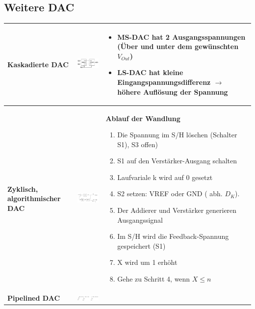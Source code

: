 \subsection{Weitere DAC}
\begin{longtable}{|>{\bfseries}p{4cm}|c|p{8cm}|}
	\hline
	Kaskadierte DAC
	& \includegraphics[width=6cm, valign=t]{./pictures/kaskadiertDAC.png}
	& \begin{itemize}
  		\item MS-DAC hat 2 Ausgangsspannungen (Über und unter dem gewünschten
  			$V_{Out}$)
  		\item LS-DAC hat kleine Eingangspannungsdifferenz $\to$ höhere Auflösung der
  			Spannung
	  \end{itemize}
	\\ \hline
	Zyklisch, algorithmischer DAC \hartl{466}
	& \includegraphics[width=6cm, valign=t]{./pictures/zyklischDAC.png}
	& \textbf{Ablauf der Wandlung}
	  \begin{enumerate}
  		\item Die Spannung im S/H löschen (Schalter S1), S3 offen)
  		\item S1 auf den Verstärker-Ausgang schalten
  		\item Laufvariale k wird auf 0 gesetzt
  		\item S2 setzen: VREF oder GND ( abh. $D_{K}$).
  		\item Der Addierer und Verstärker generieren Ausgangssignal
  		\item Im S/H wird die Feedback-Spannung gespeichert (S1)
  		\item X wird um 1 erhöht
  		\item Gehe zu Schritt 4, wenn $X\leq n$
	  \end{enumerate}
	\\ \hline
	Pipelined DAC 
	& \includegraphics[width=6cm, valign=t]{pictures/piplinedDAC}

\end{longtable}
